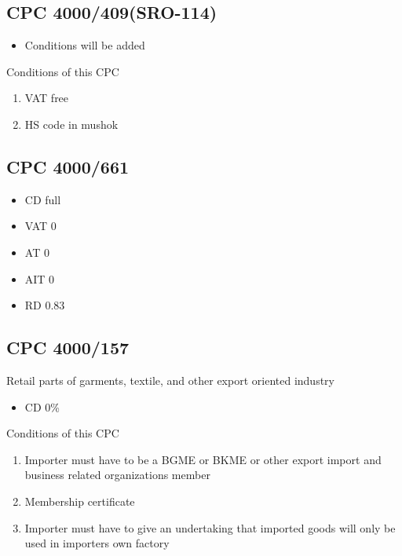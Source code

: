 \documentclass[10pt]{article}
\begin{document}
\subsection{CPC 4000/409(SRO-114)}
\begin{itemize}
        \item Conditions will be added
\end{itemize}
\begin{description}
    \item [Conditions of this CPC]
\end{description}
\begin{enumerate}
        \item VAT free
        \item HS code in mushok
\end{enumerate}
\subsection{CPC 4000/661}
\begin{itemize}
        \item CD full
        \item VAT 0%
        \item AT 0%
        \item AIT 0%
        \item RD 0.83%
\end{itemize}

\subsection{CPC 4000/157}
    Retail parts of garments, textile, and other
    export oriented industry
\begin{itemize}
        \item CD 0\%
\end{itemize}
\begin{description}
    \item [Conditions of this CPC]
\end{description}
\begin{enumerate}
        \item Importer must have to be a
            BGME or BKME or other export
            import and business related organizations
            member
        \item Membership certificate
        \item Importer must have to give an
            undertaking that imported goods will only
            be used in importers own factory
\end{enumerate}
\end{document}
